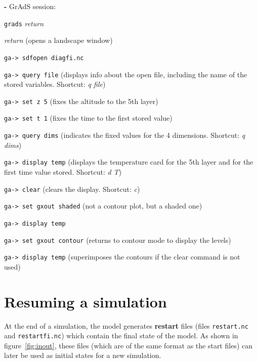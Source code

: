 \begin{description}
\item {\bf -} GrAdS session:

  \begin{description}
  \item \verb+grads+ {\it return}

  \item {\it return} (opens a landscape window)

  \item \verb+ga-> sdfopen diagfi.nc+

  \item \verb+ga-> query file+ (displays info about the open file, including the name of the stored variables. Shortcut: {\it q file})

  \item \verb+ga-> set z 5+ (fixes the altitude to the 5th layer)

  \item \verb+ga-> set t 1+ (fixes the time to the first stored value)

  \item \verb+ga-> query dims+ (indicates the fixed values for the 4
  dimensions. Shortcut: {\it q dims})

  \item \verb+ga-> display temp+ (displays the temperature card for the 5th layer and for the first time value stored. Shortcut: {\it d
  T})

  \item \verb+ga-> clear+ (clears the display. Shortcut: {\it c})

  \item \verb+ga-> set gxout shaded+ (not a contour plot, but a shaded one)

  \item \verb+ga-> display temp+

  \item \verb+ga-> set gxout contour+ (returns to contour mode to display the levels)

  \item \verb+ga-> display temp+ (superimposes the contours if the clear command is not used)

  \end{description}
\end{description}




\section{Resuming a simulation}
At the end of a simulation, the model generates {\bf restart} files
(files {\tt restart.nc} and {\tt restartfi.nc})
which contain the final state of the model.
As shown in figure~\ref{fig:inout},
these files (which are of the same format as the start files)
can later be used as initial
states for a new simulation.\\

